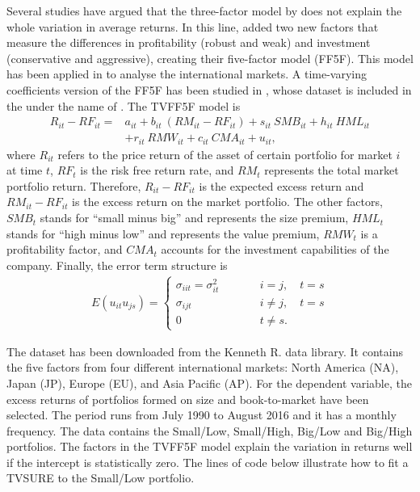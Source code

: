 Several studies have argued that the three-factor model by \citet{FamaFrench1993} does not explain the whole variation in average returns. In this line, \citet{FamaFrench2015} added two new factors that measure the differences in profitability (robust and weak) and investment (conservative and aggressive), creating their five-factor model (FF5F). This model has been applied in \citet{FamaFrench2017} to analyse the international markets. A time-varying coefficients version of the FF5F has been studied in \citet{Casasetal2019a}, whose dataset is included in the  under the name of . The TVFF5F model is
\begin{align}
R_{it} - RF_{it} = & a_{it}+ b_{it} \ (RM_{it} -RF_{it}) + s_{it} \ SMB_{it} + h_{it} \ HML_{it}  \nonumber\\
&+ r_{it}\ RMW_{it}+c_{it} \ CMA_{it}+u_{it},
\label{eq:tvff5}
\end{align}
where $R_{it}$ refers to the price return of the asset of certain portfolio for market $i$ at time $t$, $RF_t$ is the risk free return rate, and $RM_t$ represents the total market portfolio return. Therefore, $R_{it} - RF_{it}$ is the expected excess return and $RM_{it} -RF_{it}$ is the excess return on the market portfolio. The other factors, $SMB_t$ stands for ``small minus big'' and represents the size premium, $HML_t$ stands for ``high minus low'' and represents the value premium, $RMW_t$ is a profitability factor, and $CMA_t$ accounts for the investment capabilities of the company. Finally, the error term structure is
\begin{align}\nonumber
E(u_{it}u_{js})=\left\{\begin{array}{lll} \sigma_{iit}= \sigma^2_{it}&\qquad& i=j,\quad t=s\\ \sigma_{ijt}&\qquad& i\neq j,\quad t=s\\ 0&\qquad&   t\neq s. \end{array}   \right.
\end{align}


The  dataset has been downloaded from the Kenneth R. \citet{FFdata} data library. It contains the five factors from four different international markets: North America (NA), Japan (JP),  Europe (EU), and Asia Pacific (AP). For the dependent variable, the excess returns of portfolios formed on size and book-to-market have been selected. The period runs from July 1990 to August 2016 and it has a monthly frequency. The data contains the Small/Low, Small/High, Big/Low and Big/High portfolios. The factors in the TVFF5F model explain the variation in returns well if the intercept is statistically zero. The lines of code below illustrate how to fit a TVSURE to the Small/Low portfolio. 

